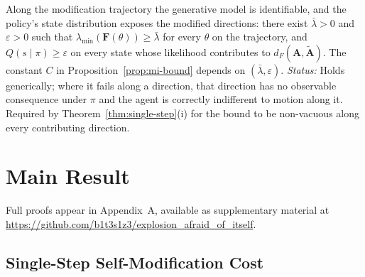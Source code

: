 \documentclass[runningheads]{llncs}
\begin{document}
\begin{assumption}
\label{ass:identifiability}
Along the modification trajectory the generative model is identifiable, and
the policy's state distribution exposes the modified directions: there exist
$\bar\lambda > 0$ and $\varepsilon > 0$ such that
$\lambda_{\min}(\mathbf{F}(\theta)) \geq \bar\lambda$ for every $\theta$ on the
trajectory, and $Q(s\mid\pi) \geq \varepsilon$ on every state whose likelihood
contributes to $d_F(\mathbf{A}, \tilde{\mathbf{A}})$. The constant $C$ in Proposition~\ref{prop:mi-bound}
depends on $(\bar\lambda, \varepsilon)$. \emph{Status:} Holds generically;
where it fails along a direction, that direction has no observable consequence
under $\pi$ and the agent is correctly indifferent to motion along it. Required
by Theorem~\ref{thm:single-step}(i) for the bound to be non-vacuous along every
contributing direction.
\end{assumption}

\section{Main Result}

Full proofs appear in Appendix~A, available as supplementary material at \url{https://github.com/b1t3s1z3/explosion_afraid_of_itself}.

\subsection{Single-Step Self-Modification Cost}
\end{document}
